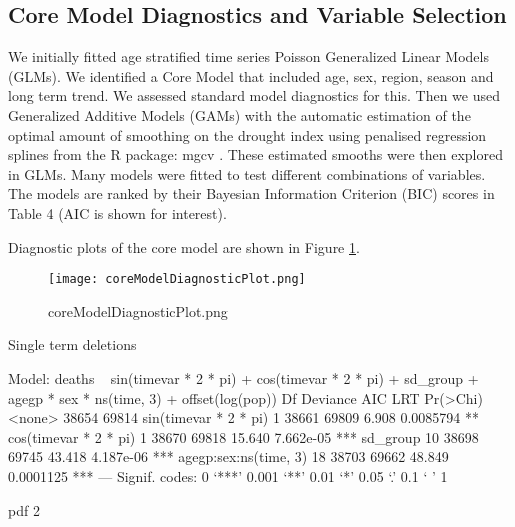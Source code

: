 \documentclass[a4paper]{article}                %
\begin{document}
\subsection{Core Model Diagnostics and Variable Selection}



        We initially fitted age stratified time series Poisson Generalized Linear Models (GLMs). We identified a Core Model that included age, sex, region, season and long term trend.  We assessed standard model diagnostics for this.
        Then we used Generalized Additive Models (GAMs) with the automatic estimation of the optimal amount of smoothing on the drought index using penalised regression splines from the R package: mgcv \cite{Wood2008}.  These estimated smooths were then explored in GLMs. Many models were fitted to test different combinations of variables.  The models are ranked by their Bayesian Information Criterion (BIC) scores in Table 4 (AIC is shown for interest).







        Diagnostic plots of the core model are shown in Figure \ref{fig:coreModelDiagnosticPlot.png}.

        \begin{figure}[!h]
        \centering
        \texttt{[image: coreModelDiagnosticPlot.png]}
        \caption{coreModelDiagnosticPlot.png}
        \label{fig:coreModelDiagnosticPlot.png}
        \end{figure}


\begin{Schunk}
\begin{Soutput}
Single term deletions

Model:
deaths ~ sin(timevar * 2 * pi) + cos(timevar * 2 * pi) + sd_group + 
    agegp * sex * ns(time, 3) + offset(log(pop))
                      Df Deviance   AIC    LRT  Pr(>Chi)    
<none>                      38654 69814                     
sin(timevar * 2 * pi)  1    38661 69809  6.908 0.0085794 ** 
cos(timevar * 2 * pi)  1    38670 69818 15.640 7.662e-05 ***
sd_group              10    38698 69745 43.418 4.187e-06 ***
agegp:sex:ns(time, 3) 18    38703 69662 48.849 0.0001125 ***
---
Signif. codes:  0 ‘***’ 0.001 ‘**’ 0.01 ‘*’ 0.05 ‘.’ 0.1 ‘ ’ 1
\end{Soutput}
\begin{Soutput}
pdf 
  2 
\end{Soutput}
\end{Schunk}
\end{document}
